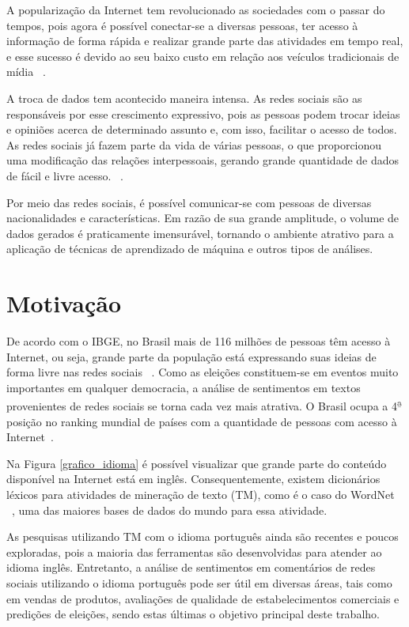 A popularização da Internet tem revolucionado as sociedades com o passar do tempos,
pois agora é possível conectar-se a diversas pessoas, ter acesso à informação de forma rápida
e realizar grande parte das atividades  em tempo real, e esse sucesso é devido ao seu baixo custo
em relação aos veículos tradicionais de mídia ~\cite{song2014analyzing}. 

A troca de dados tem acontecido maneira intensa. As redes sociais são as responsáveis por esse crescimento
expressivo, pois as pessoas podem trocar ideias e opiniões acerca de determinado assunto e, com isso, facilitar
o acesso de todos. As redes sociais já fazem parte da vida de várias pessoas, 
o que proporcionou uma modificação das relações interpessoais, gerando grande quantidade de dados de fácil e livre acesso. ~\cite{5194581}.

Por meio das redes sociais, é possível comunicar-se com pessoas de diversas nacionalidades
e características. Em razão de sua grande amplitude, o volume de dados gerados é praticamente imensurável, 
tornando o ambiente atrativo para a aplicação de técnicas de aprendizado de máquina e outros tipos de análises.

\section{Motivação}

De acordo com o \acrshort{IBGE}, no Brasil mais de 116 milhões de pessoas têm acesso à Internet, ou seja, grande parte da população está expressando suas ideias
de forma livre nas redes sociais ~\cite{notibge}. Como as eleições constituem-se em eventos muito importantes em qualquer democracia, a análise de sentimentos em textos provenientes de redes sociais se torna cada vez mais atrativa.
O Brasil ocupa a 4\textsuperscript{\b{a}} posição no ranking mundial de países com a quantidade de pessoas com acesso à Internet~\cite{ILS}.

Na Figura \ref{grafico_idioma} é possível visualizar que grande parte do conteúdo disponível na Internet está em inglês. Consequentemente, existem dicionários léxicos para atividades de mineração de texto (\acrshort{TM}), como é o caso do WordNet ~\cite{miller1995wordnet}, uma das maiores bases de dados do mundo para essa atividade. 

As pesquisas utilizando \acrshort{TM} com o idioma português ainda são recentes e poucos exploradas, pois a maioria das ferramentas são desenvolvidas para atender ao idioma 
inglês. Entretanto, a análise de sentimentos em comentários de redes sociais utilizando o idioma português pode ser útil em diversas áreas, tais como em vendas de produtos, avaliações de qualidade de estabelecimentos comerciais e predições de eleições, sendo estas últimas o objetivo principal deste trabalho.




